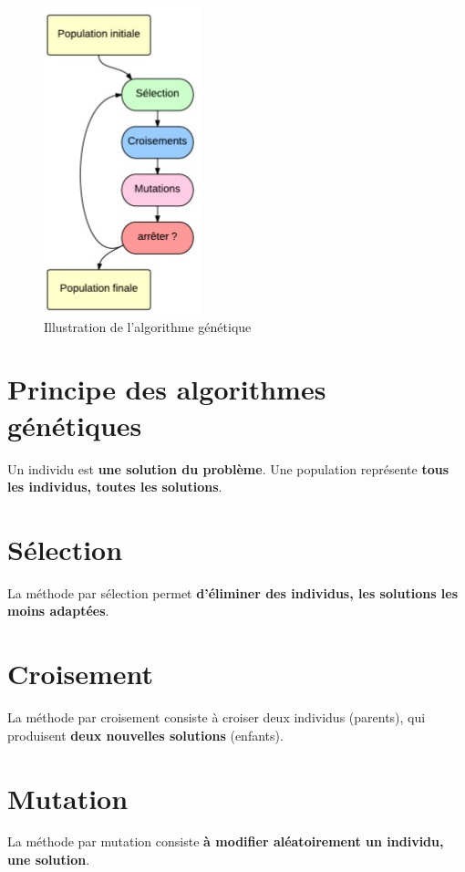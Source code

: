 \documentclass[12pt]{report}
\begin{document}
\begin{figure}[H]
\centering
\includegraphics[scale=0.74]{img/algo-genetic}
\caption{Illustration de l'algorithme génétique}
\end{figure}

\section{Principe des algorithmes génétiques}

Un individu est \textbf{une solution du problème}. Une population représente \textbf{tous les individus, toutes les solutions}.


\section{Sélection}

La méthode par sélection permet \textbf{d'éliminer des individus, les solutions les moins adaptées}.

\section{Croisement}

La méthode par croisement consiste à croiser deux individus (parents), qui produisent \textbf{deux nouvelles solutions} (enfants).

\section{Mutation}

La méthode par mutation consiste \textbf{à modifier aléatoirement un individu, une solution}.
\end{document}
